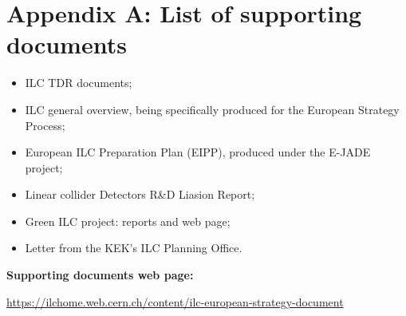 \documentclass[%
 reprint,
 floatfix,
 amsmath,amssymb,
 aps,
]{revtex4-1}
\begin{document}
\onecolumngrid
\newpage

\appendix


\section*{\label{Appendix3} \Large{Appendix A: List of supporting documents} }
\begin{itemize}
\item
ILC TDR documents;
\item
ILC general overview, being specifically produced for the European Strategy Process;
\item
European ILC Preparation Plan (EIPP), produced under the E-JADE project;
\item
Linear collider Detectors R\&D Liasion Report;
\item
Green ILC project: reports and web page;
\item
Letter from the KEK’s ILC Planning Office.

\end{itemize}

\textbf{Supporting documents web page:} 


\url{https://ilchome.web.cern.ch/content/ilc-european-strategy-document}
\end{document}
